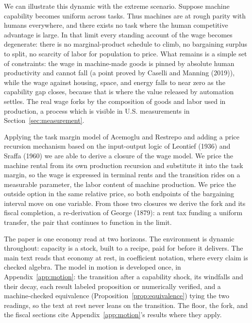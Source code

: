 \documentclass[12pt]{article}
\theoremstyle{plain}
\begin{document}
We can illustrate this dynamic with the extreme scenario. Suppose machine capability becomes uniform across tasks. Thus machines are at rough parity with humans everywhere, and there exists no task where the human competitive advantage is large. In that limit every standing account of the wage becomes degenerate: there is no marginal-product schedule to climb, no bargaining surplus to split, no scarcity of labor for population to price. What remains is a simple set of constraints: the wage in machine-made goods is pinned by absolute human productivity and cannot fall (a point proved by Caselli and Manning (2019)), while the wage against housing, space, and energy falls to near zero as the capability gap closes, because that is where the value released by automation settles. The real wage forks by the composition of goods and labor used in production, a process which is visible in U.S. measurements in Section~\ref{sec:measurement}.

Applying the task margin model of Acemoglu and Restrepo and adding a price recursion mechanism based on the input-output logic of Leontief (1936) and Sraffa (1960) we are able to derive a closure of the wage model. We price the machine rental from its own production recursion and substitute it into the task margin, so the wage is expressed in terminal rents and the transition rides on a measurable parameter, the labor content of machine production. We price the outside option in the same relative price, so both endpoints of the bargaining interval move on one variable. From those two closures we derive the fork and its fiscal completion, a re-derivation of George (1879): a rent tax funding a uniform transfer, the pair that continues to function in the limit.

The paper is one economy read at two horizons. The environment is dynamic throughout: capacity is a stock, built to a recipe, paid for before it delivers. The main text reads that economy at rest, in coefficient notation, where every claim is checked algebra. The model in motion is developed once, in Appendix~\ref{app:motion}: the transition after a capability shock, its windfalls and their decay, each result labeled proposition or numerically verified, and a machine-checked equivalence (Proposition~\ref{prop:equivalence}) tying the two readings, so the text at rest never leans on the transition. The floor, the fork, and the fiscal sections cite Appendix~\ref{app:motion}'s results where they apply.
\end{document}
